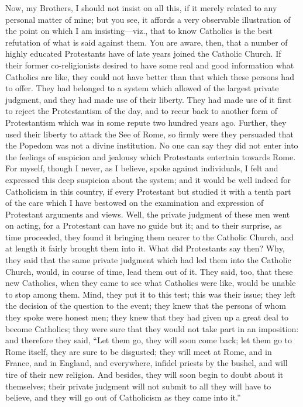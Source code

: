 Now, my Brothers, I should not insist on all this, if
it merely related to any personal matter of mine; but you
see, it affords a very observable illustration of the
point on which I am insisting—viz., that to know
Catholics is the best refutation of what is said against
them. You are aware, then, that a number of highly
educated Protestants have of late years joined the
Catholic Church. If their former co-religionists desired
to have some real and good information what Catholics are
like, they could not have better than that which these
persons had to offer. They had belonged to a system which
allowed of the largest private judgment, and they had
made use of their liberty. They had made use of it first
to reject the Protestantism of the day, and to recur back
to another form of Protestantism which was in some repute
two hundred years ago. Further, they used their liberty
to attack the See of Rome, so firmly were they persuaded
that the Popedom was not a divine institution. No one can
say they did not enter into the feelings of suspicion and
jealousy which Protestants entertain towards Rome. For
myself, though I never, as I believe, spoke against individuals, I felt and expressed this deep suspicion
about the system; and it would be well indeed for
Catholicism in this country, if every Protestant but
studied it with a tenth part of the care which I have
bestowed on the examination and expression of Protestant
arguments and views. Well, the private judgment of these
men went on acting, for a Protestant can have no guide
but it; and to their surprise, as time proceeded, they
found it bringing them nearer to the Catholic Church, and
at length it fairly brought them into it. What did
Protestants say then? Why, they said that the same
private judgment which had led them into the Catholic
Church, would, in course of time, lead them out of it.
They said, too, that these new Catholics, when they came
to see what Catholics were like, would be unable to stop
among them. Mind, they put it to this test; this was
their issue; they left the decision of the question to
the event; they knew that the persons of whom they spoke
were honest men; they knew that they had given up a great
deal to become Catholics; they were sure that they would
not take part in an imposition: and therefore they said,
``Let them go, they will soon come back; let them go
to Rome itself, they are sure to be disgusted; they will
meet at Rome, and in France, and in England, and
everywhere, infidel priests by the bushel, and will tire
of their new religion. And besides, they will soon begin
to doubt about it themselves; their private judgment will
not submit to all they will have to believe, and they
will go out of Catholicism as they came into it.''

